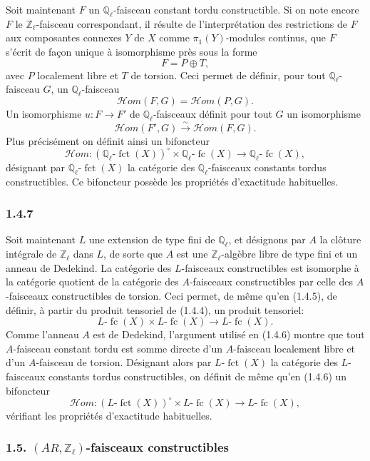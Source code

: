 \documentclass[11pt]{article}
\providecommand{\fct}{\operatorname{fct}}
\providecommand{\cHom}{\mathcal{H}om}
\providecommand{\fc}{\operatorname{fc}}
\begin{document}
Soit maintenant \(F\) un \(\mathbb Q_\ell\)-faisceau constant tordu constructible. Si on note encore \(F\) le \(\mathbb Z_\ell\)-faisceau correspondant, il résulte de l'interprétation des restrictions de \(F\) aux composantes connexes \(Y\) de \(X\) comme \(\pi_1(Y)\)-modules continus, que \(F\) s'écrit de façon unique à isomorphisme près sous la forme
\[
F=P\oplus T,
\]
avec \(P\) localement libre et \(T\) de torsion. Ceci permet de définir, pour tout \(\mathbb Q_\ell\)-faisceau \(G\), un \(\mathbb Q_\ell\)-faisceau
\[
\cHom(F,G)=\cHom(P,G).
\]
Un isomorphisme \(u:F\to F'\) de \(\mathbb Q_\ell\)-faisceaux définit pour tout \(G\) un isomorphisme
\[
\cHom(F',G)\xrightarrow{\sim}\cHom(F,G).
\]
Plus précisément on définit ainsi un bifoncteur
\[
\cHom:(\mathbb Q_\ell\text{-}\fct(X))^\circ\times \mathbb Q_\ell\text{-}\fc(X)
\longrightarrow \mathbb Q_\ell\text{-}\fc(X),
\]
désignant par \(\mathbb Q_\ell\text{-}\fct(X)\) la catégorie des \(\mathbb Q_\ell\)-faisceaux constants tordus constructibles. Ce bifoncteur possède les propriétés d'exactitude habituelles.

\subsubsection*{1.4.7}
Soit maintenant \(L\) une extension de type fini de \(\mathbb Q_\ell\), et désignons par \(A\) la clôture intégrale de \(\mathbb Z_\ell\) dans \(L\), de sorte que \(A\) est une \(\mathbb Z_\ell\)-algèbre libre de type fini et un anneau de Dedekind. La catégorie des \(L\)-faisceaux constructibles est isomorphe à la catégorie quotient de la catégorie des \(A\)-faisceaux constructibles par celle des \(A\)-faisceaux constructibles de torsion. Ceci permet, de même qu'en (1.4.5), de définir, à partir du produit tensoriel de (1.4.4), un produit tensoriel:
\[
L\text{-}\fc(X)\times L\text{-}\fc(X)\longrightarrow L\text{-}\fc(X).
\]
Comme l'anneau \(A\) est de Dedekind, l'argument utilisé en (1.4.6) montre que tout \(A\)-faisceau constant tordu est somme directe d'un \(A\)-faisceau localement libre et d'un \(A\)-faisceau de torsion. Désignant alors par \(L\text{-}\fct(X)\) la catégorie des \(L\)-faisceaux constants tordus constructibles, on définit de même qu'en (1.4.6) un bifoncteur
\[
\cHom:(L\text{-}\fct(X))^\circ\times L\text{-}\fc(X)
\longrightarrow L\text{-}\fc(X),
\]
vérifiant les propriétés d'exactitude habituelles.

\subsubsection*{1.5. \((AR,\mathbb Z_\ell)\)-faisceaux constructibles}
\end{document}
